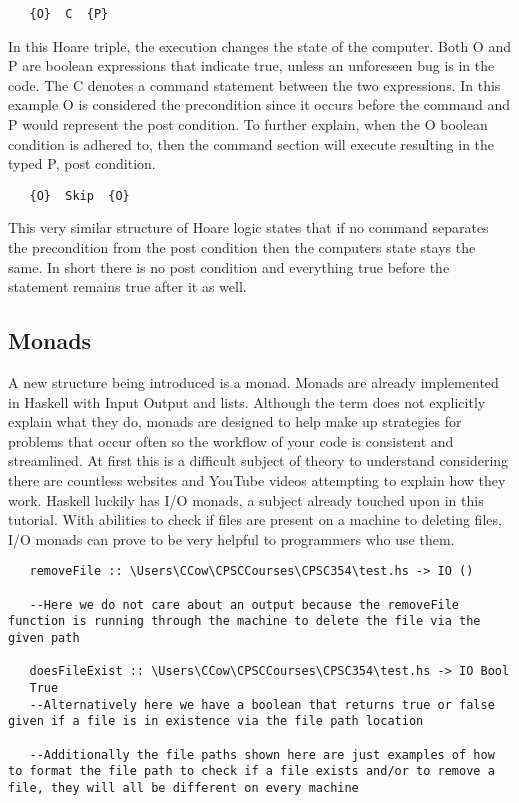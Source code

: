 \documentclass{article}
\begin{document}
\begin{lstlisting}
   {O}  C  {P}
\end{lstlisting}

\noindent In this Hoare triple, the execution changes the state of the computer. Both O and P are boolean expressions that indicate true, unless an unforeseen bug is in the code. The C denotes a command statement between the two expressions. In this example O is considered the precondition since it occurs before the command and P would represent the post condition. To further explain, when the O boolean condition is adhered to, then the command section will execute resulting in the typed P, post condition. 

\caption{Empty Command Logic}
\begin{lstlisting}
   {O}  Skip  {O}
\end{lstlisting}

This very similar structure of Hoare logic states that if no command separates the precondition from the post condition then the computers state stays the same. In short there is no post condition and everything true before the statement remains true after it as well.

\subsection{Monads}
A new structure being introduced is a monad. Monads are already implemented in Haskell with Input Output and lists. Although the term does not explicitly explain what they do, monads are designed to help make up strategies for problems that occur often so the workflow of your code is consistent and streamlined. At first this is a difficult subject of theory to understand considering there are countless websites and YouTube videos attempting to explain how they work. Haskell luckily has I/O monads, a subject already touched upon in this tutorial. With abilities to check if files are present on a machine to deleting files, I/O monads can prove to be very helpful to programmers who use them.

\medskip
\caption{Default I/O Monad within Haskell}
\begin{lstlisting}
   removeFile :: \Users\CCow\CPSCCourses\CPSC354\test.hs -> IO ()
   
   --Here we do not care about an output because the removeFile function is running through the machine to delete the file via the given path
   
   doesFileExist :: \Users\CCow\CPSCCourses\CPSC354\test.hs -> IO Bool
   True
   --Alternatively here we have a boolean that returns true or false given if a file is in existence via the file path location
   
   --Additionally the file paths shown here are just examples of how to format the file path to check if a file exists and/or to remove a file, they will all be different on every machine
\end{lstlisting}
\end{document}

